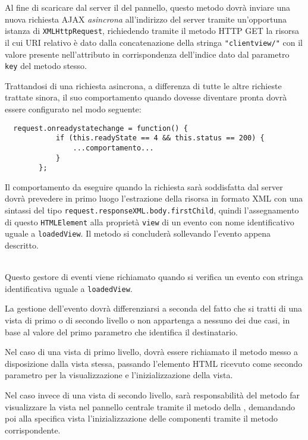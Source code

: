 \begin{description}
Al fine di scaricare dal server il  del pannello, questo metodo dovrà inviare una nuova richiesta AJAX \emph{asincrona} all'indirizzo del server tramite un'opportuna istanza di \verb'XMLHttpRequest', richiedendo tramite il metodo HTTP GET la risorsa il cui URI relativo è dato dalla concatenazione della stringa \verb'"clientview/"' con il valore presente nell'attributo  in corrispondenza dell'indice dato dal parametro \verb'key' del metodo stesso.

Trattandosi di una richiesta asincrona, a differenza di tutte le altre richieste trattate sinora, il suo comportamento quando dovesse diventare pronta dovrà essere configurato nel modo seguente:
\begin{verbatim}
  request.onreadystatechange = function() {
            if (this.readyState == 4 && this.status == 200) {
                ...comportamento...
            }
        };
\end{verbatim}

Il comportamento da eseguire quando la richiesta sarà soddisfatta dal server dovrà prevedere in primo luogo l'estrazione della risorsa in formato XML con una sintassi del tipo \verb'request.responseXML.body.firstChild', quindi l'assegnamento di questo \verb'HTMLElement' alla proprietà \verb'view' di un evento con nome identificativo uguale a \verb'loadedView'. Il metodo si concluderà sollevando l'evento appena descritto.

\item{}\\
Questo gestore di eventi viene richiamato quando si verifica un evento con stringa identificativa uguale a \verb'loadedView'.

La gestione dell'evento dovrà differenziarsi a seconda del fatto che si tratti di una vista di primo o di secondo livello o non appartenga a nessuno dei due casi, in base al valore del primo parametro che identifica il  destinatario.

Nel caso di una vista di primo livello, dovrà essere richiamato il metodo  messo a disposizione dalla vista stessa, passando l'elemento HTML ricevuto come secondo parametro per la visualizzazione e l'inizializzazione della vista.

Nel caso invece di una vista di secondo livello, sarà responsabilità del metodo far visualizzare la vista nel pannello centrale tramite il metodo  della , demandando poi alla specifica vista l'inizializzazione delle componenti tramite il metodo  corrispondente.


\end{description}

